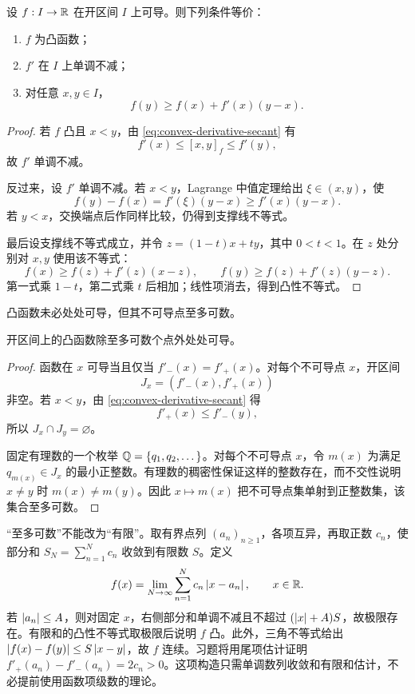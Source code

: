 \begin{theorem}[可导凸函数的判据]
\label{thm:convex-derivative-monotone}
设 \(f:I\to\mathbb{R}\) 在开区间 \(I\) 上可导。则下列条件等价：
\begin{enumerate}
 \item \(f\) 为凸函数；
 \item \(f'\) 在 \(I\) 上单调不减；
 \item 对任意 \(x,y\in I\)，
 \begin{equation}
  f(y)\ge f(x)+f'(x)(y-x).
  \label{eq:tangent-support-differentiable}
 \end{equation}
\end{enumerate}
\end{theorem}

\begin{proof}
若 \(f\) 凸且 \(x<y\)，由 \eqref{eq:convex-derivative-secant} 有
\[
 f'(x)\le[x,y]_f\le f'(y),
\]
故 \(f'\) 单调不减。

反过来，设 \(f'\) 单调不减。若 \(x<y\)，Lagrange 中值定理给出 \(\xi\in(x,y)\)，使
\[
 f(y)-f(x)=f'(\xi)(y-x)\ge f'(x)(y-x).
\]
若 \(y<x\)，交换端点后作同样比较，仍得到支撑线不等式。

最后设支撑线不等式成立，并令 \(z=(1-t)x+ty\)，其中 \(0<t<1\)。在 \(z\) 处分别对 \(x,y\) 使用该不等式：
\[
 f(x)\ge f(z)+f'(z)(x-z),\qquad
 f(y)\ge f(z)+f'(z)(y-z).
\]
第一式乘 \(1-t\)，第二式乘 \(t\) 后相加；线性项消去，得到凸性不等式。
\end{proof}

凸函数未必处处可导，但其不可导点至多可数。

\begin{theorem}[凸函数的可导点]
\label{thm:convex-countable-nondifferentiability}
开区间上的凸函数除至多可数个点外处处可导。
\end{theorem}

\begin{proof}
函数在 \(x\) 可导当且仅当 \(f'_-(x)=f'_+(x)\)。对每个不可导点 \(x\)，开区间
\[
 J_x=(f'_-(x),f'_+(x))
\]
非空。若 \(x<y\)，由 \eqref{eq:convex-derivative-secant} 得
\[
 f'_+(x)\le f'_-(y),
\]
所以 \(J_x\cap J_y=\varnothing\)。

固定有理数的一个枚举 \(\mathbb{Q}=\{q_1,q_2,\dots\}\)。对每个不可导点 \(x\)，令 \(m(x)\) 为满足 \(q_{m(x)}\in J_x\) 的最小正整数。有理数的稠密性保证这样的整数存在，而不交性说明 \(x\ne y\) 时 \(m(x)\ne m(y)\)。因此 \(x\mapsto m(x)\) 把不可导点集单射到正整数集，该集合至多可数。
\end{proof}

“至多可数”不能改为“有限”。取有界点列 \((a_n)_{n\ge1}\)，各项互异，再取正数 \(c_n\)，使部分和 \(S_N=\sum_{n=1}^N c_n\) 收敛到有限数 \(S\)。定义
\[
 f(x)=\lim_{N\to\infty}\sum_{n=1}^{N}c_n\left|x-a_n\right|,\qquad x\in\mathbb{R}.
\]
若 \(\left|a_n\right|\le A\)，则对固定 \(x\)，右侧部分和单调不减且不超过 \((\left|x\right|+A)S\)，故极限存在。有限和的凸性不等式取极限后说明 \(f\) 凸。此外，三角不等式给出 \(\left|f(x)-f(y)\right|\le S\left|x-y\right|\)，故 \(f\) 连续。习题将用尾项估计证明 \(f'_+(a_n)-f'_-(a_n)=2c_n>0\)。这项构造只需单调数列收敛和有限和估计，不必提前使用函数项级数的理论。

